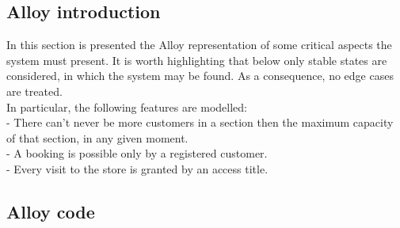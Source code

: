\subsection{Alloy introduction}

In this section is presented the Alloy representation of some critical
aspects the system must present. It is worth highlighting that below only
stable states are considered, in which the system may be found. As a
consequence, no edge cases are treated. \\
In particular, the following features are modelled:\\
- There can't never be more customers in a section then the maximum capacity of that section, in any given moment.\\
- A booking is possible only by a registered customer.\\
- Every visit to the store is granted by an access title.\\

\subsection{Alloy code}

